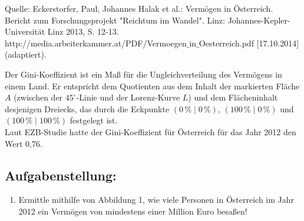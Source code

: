 \begin{langesbeispiel}
{}

\begin{tiny}\begin{singlespace}
Quelle: Eckerstorfer, Paul, Johannes Halak et al.: Vermögen in Österreich. Bericht zum Forschungsprojekt "Reichtum im Wandel".
Linz: Johannes-Kepler-Universität Linz 2013, S. 12-13.
http://media.arbeiterkammer.at/PDF/Vermoegen$\_$in$\_$Oesterreich.pdf [17.10.2014](adaptiert).\end{singlespace}
\end{tiny}

Der Gini-Koeffizient ist ein Maß für die Ungleichverteilung des Vermögens in einem Land. Er entspricht dem Quotienten aus dem Inhalt der markierten Fläche $A$ (zwischen der $45^\circ$-Linie und der Lorenz-Kurve $L$) und dem Flächeninhalt desjenigen Dreiecks, das durch die Eckpunkte $(0\,\%\mid 0\,\%)$, $(100\,\%\mid 0\,\%)$ und $(100\,\%\mid 100\,\%)$ festgelegt ist.\\
Laut EZB-Studie hatte der Gini-Koeffizient für Österreich für das Jahr 2012 den Wert 0,76.

\subsection{Aufgabenstellung:}
\begin{enumerate}
	\item {} Ermittle mithilfe von Abbildung 1, wie viele Personen in Österreich im Jahr 2012 ein Vermögen von mindestens einer Million Euro besaßen!
	

\end{enumerate}
\end{langesbeispiel}
